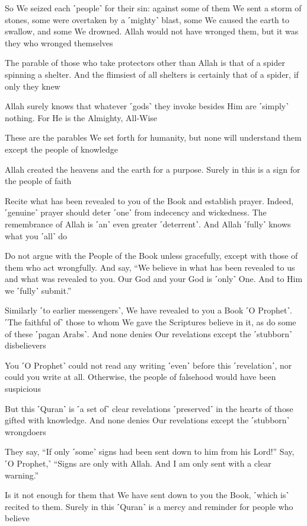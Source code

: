 So We seized each ˹people˺ for their sin: against some of them We sent a storm of stones, some were overtaken by a ˹mighty˺ blast, some We caused the earth to swallow, and some We drowned. Allah would not have wronged them, but it was they who wronged themselves

The parable of those who take protectors other than Allah is that of a spider spinning a shelter. And the flimsiest of all shelters is certainly that of a spider, if only they knew

Allah surely knows that whatever ˹gods˺ they invoke besides Him are ˹simply˺ nothing. For He is the Almighty, All-Wise

These are the parables We set forth for humanity, but none will understand them except the people of knowledge

Allah created the heavens and the earth for a purpose. Surely in this is a sign for the people of faith

Recite what has been revealed to you of the Book and establish prayer. Indeed, ˹genuine˺ prayer should deter ˹one˺ from indecency and wickedness. The remembrance of Allah is ˹an˺ even greater ˹deterrent˺. And Allah ˹fully˺ knows what you ˹all˺ do

Do not argue with the People of the Book unless gracefully, except with those of them who act wrongfully. And say, “We believe in what has been revealed to us and what was revealed to you. Our God and your God is ˹only˺ One. And to Him we ˹fully˺ submit.”

Similarly ˹to earlier messengers˺, We have revealed to you a Book ˹O Prophet˺. ˹The faithful of˺ those to whom We gave the Scriptures believe in it, as do some of these ˹pagan Arabs˺. And none denies Our revelations except the ˹stubborn˺ disbelievers

You ˹O Prophet˺ could not read any writing ˹even˺ before this ˹revelation˺, nor could you write at all. Otherwise, the people of falsehood would have been suspicious

But this ˹Quran˺ is ˹a set of˺ clear revelations ˹preserved˺ in the hearts of those gifted with knowledge. And none denies Our revelations except the ˹stubborn˺ wrongdoers

They say, “If only ˹some˺ signs had been sent down to him from his Lord!” Say, ˹O Prophet,˺ “Signs are only with Allah. And I am only sent with a clear warning.”

Is it not enough for them that We have sent down to you the Book, ˹which is˺ recited to them. Surely in this ˹Quran˺ is a mercy and reminder for people who believe

